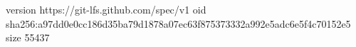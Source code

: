 version https://git-lfs.github.com/spec/v1
oid sha256:a97dd0e0cc186d35ba79d1878a07ec63f875373332a992e5adc6e5f4c70152e5
size 55437
